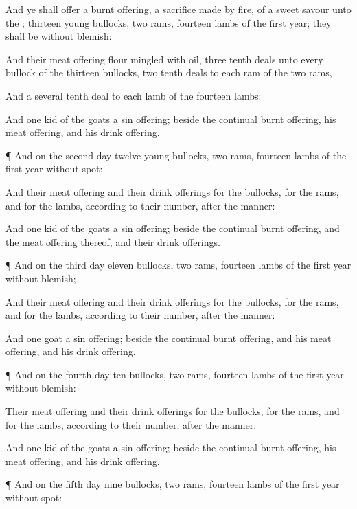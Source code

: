{And ye shall
offer a burnt
offering, a sacrifice made by
fire, of a
sweet
savour unto the
{};
thirteen
young
bullocks,
two
rams,
{}
fourteen
lambs of the
first
year; they shall be without
blemish:

And their meat
offering
{}
flour
mingled with
oil,
three tenth
deals unto
every
bullock of the
thirteen
bullocks,
two tenth
deals to
each
ram of the
two
rams,

And a several tenth
deal to
each
lamb of the
fourteen
lambs:

And
one
kid of the
goats
{} a sin
offering; beside the
continual burnt
offering, his meat
offering, and his drink
offering.


\par }{\PP {}¶ And on the
second
day
{}
twelve
young
bullocks,
two
rams,
fourteen
lambs of the
first
year without
spot:

And their meat
offering and their drink
offerings for the
bullocks, for the
rams, and for the
lambs,
{} according to their
number, after the
manner:

And
one
kid of the
goats
{} a sin
offering; beside the
continual burnt
offering, and the meat
offering thereof, and their drink
offerings.


\par }{\PP {}¶ And on the
third
day
eleven
bullocks,
two
rams,
fourteen
lambs of the
first
year without
blemish;

And their meat
offering and their drink
offerings for the
bullocks, for the
rams, and for the
lambs,
{} according to their
number, after the
manner:

And
one
goat
{} a sin
offering; beside the
continual burnt
offering, and his meat
offering, and his drink
offering.


\par }{\PP {}¶ And on the
fourth
day
ten
bullocks,
two
rams,
{}
fourteen
lambs of the
first
year without
blemish:

Their meat
offering and their drink
offerings for the
bullocks, for the
rams, and for the
lambs,
{} according to their
number, after the
manner:

And
one
kid of the
goats
{} a sin
offering; beside the
continual burnt
offering, his meat
offering, and his drink
offering.


\par }{\PP {}¶ And on the
fifth
day
nine
bullocks,
two
rams,
{}
fourteen
lambs of the
first
year without
spot:

}
